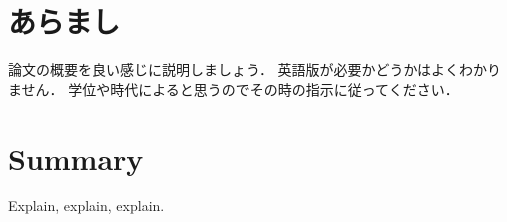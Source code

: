 \section*{あらまし}\label{sec:abst:jp}
論文の概要を良い感じに説明しましょう．
英語版が必要かどうかはよくわかりません．
学位や時代によると思うのでその時の指示に従ってください．

\section*{Summary}\label{sec:abst:en}
Explain, explain, explain.

